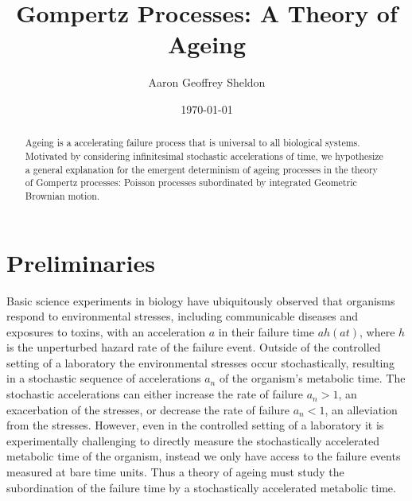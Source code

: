 \documentclass{article}
\theoremstyle{definition}\newtheorem{definition}{Definition}
\begin{document}
  \title{Gompertz Processes: A Theory of Ageing}
  \author{Aaron Geoffrey Sheldon}
  \date{\today}
  \maketitle

  \begin{abstract}
    Ageing is a accelerating failure process that is universal to all biological systems.
    Motivated by considering infinitesimal stochastic accelerations of time, we hypothesize
    a general explanation for the emergent determinism of ageing processes in the theory of
    Gompertz processes: Poisson processes subordinated by integrated Geometric Brownian
    motion.
  \end{abstract}

  \section{Preliminaries}
  Basic science experiments in biology have ubiquitously observed that organisms respond to
  environmental stresses, including communicable diseases and exposures to toxins, with an
  acceleration $a$ in their failure time $a h\left(a t\right)$, where $h$ is the unperturbed
  hazard rate of the failure event. Outside of the controlled setting of a laboratory the
  environmental stresses occur stochastically, resulting in a stochastic sequence of
  accelerations $a_n$ of the organism's metabolic time. The stochastic accelerations can
  either increase the rate of failure $a_n > 1$, an exacerbation of the stresses, or
  decrease the rate of failure $a_n < 1$, an alleviation from the stresses. However, even in
  the controlled setting of a laboratory it is experimentally challenging to directly
  measure the stochastically accelerated metabolic time of the organism, instead we only
  have access to the failure events measured at bare time units. Thus a theory of ageing
  must study the subordination of the failure time by a stochastically accelerated metabolic
  time.
\end{document}
